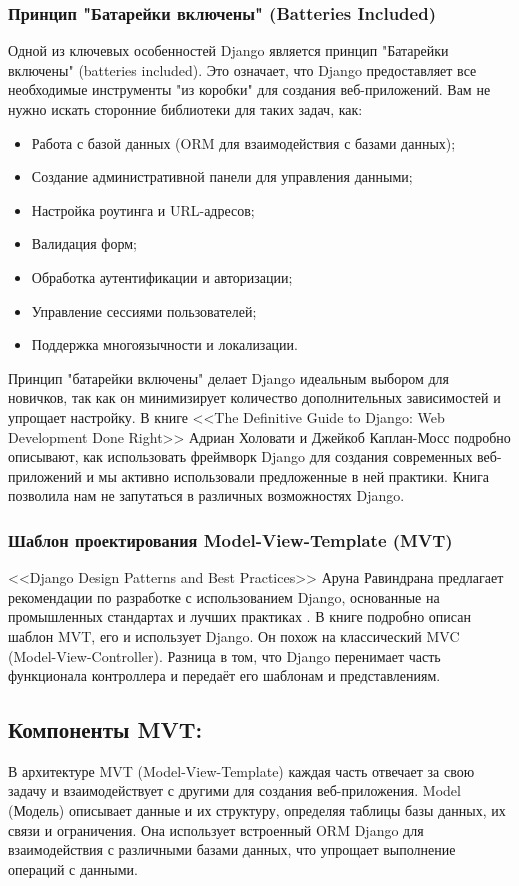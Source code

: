 \subsubsection*{Принцип "Батарейки включены" (Batteries Included)}
Одной из ключевых особенностей Django является принцип "Батарейки включены" (batteries included). Это означает, что Django предоставляет все необходимые инструменты "из коробки" для создания веб-приложений. Вам не нужно искать сторонние библиотеки для таких задач, как:
\begin{itemize}
    \item Работа с базой данных (ORM для взаимодействия с базами данных);
    \item Создание административной панели для управления данными;
    \item Настройка роутинга и URL-адресов;
    \item Валидация форм;
    \item Обработка аутентификации и авторизации;
    \item Управление сессиями пользователей;
    \item Поддержка многоязычности и локализации.
\end{itemize}

Принцип "батарейки включены" делает Django идеальным выбором для новичков, так как он минимизирует количество дополнительных зависимостей и упрощает настройку.  В книге <<The Definitive Guide to Django: Web Development Done Right>> Адриан Холовати и Джейкоб Каплан-Мосс подробно описывают, как использовать фреймворк Django для создания современных веб-приложений и мы активно использовали  предложенные в ней практики\cite{holovaty2009definitive}. Книга позволила нам не запутаться в различных возможностях Django.

\subsubsection*{Шаблон проектирования Model-View-Template (MVT)}

<<Django Design Patterns and Best Practices>> Аруна Равиндрана предлагает рекомендации по разработке с использованием Django, основанные на промышленных стандартах и лучших практиках \cite{ravindran2018django}. В книге подробно описан шаблон MVT, его и 
использует Django. Он похож на классический MVC (Model-View-Controller). Разница в том, что Django перенимает часть функционала контроллера и передаёт его шаблонам и представлениям.
\subsection*{Компоненты MVT:}
В архитектуре MVT (Model-View-Template) каждая часть отвечает за свою задачу и взаимодействует с другими для создания веб-приложения. Model (Модель) описывает данные и их структуру, определяя таблицы базы данных, их связи и ограничения. Она использует встроенный ORM Django для взаимодействия с различными базами данных, что упрощает выполнение операций с данными.

